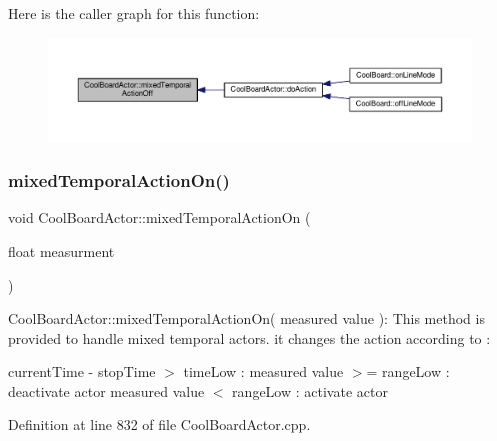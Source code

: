 Here is the caller graph for this function\+:\nopagebreak
\begin{figure}[H]
\begin{center}
\leavevmode
\includegraphics[width=350pt]{dc/d69/class_cool_board_actor_a00b29c4abf0388551aa6812372113cf1_icgraph}
\end{center}
\end{figure}
\mbox{\label{class_cool_board_actor_a216aa7a0cfd1f31d0025cc91c2ecd5dd}} 
\subsubsection{\texorpdfstring{mixed\+Temporal\+Action\+On()}{mixedTemporalActionOn()}}
{\footnotesize\ttfamily void Cool\+Board\+Actor\+::mixed\+Temporal\+Action\+On (\begin{DoxyParamCaption}\item[{float}]{measurment }\end{DoxyParamCaption})}

Cool\+Board\+Actor\+::mixed\+Temporal\+Action\+On( measured value )\+: This method is provided to handle mixed temporal actors. it changes the action according to \+:

current\+Time -\/ stop\+Time $>$ time\+Low \+: measured value $>$= range\+Low \+: deactivate actor measured value $<$ range\+Low \+: activate actor 

Definition at line 832 of file Cool\+Board\+Actor.\+cpp.


